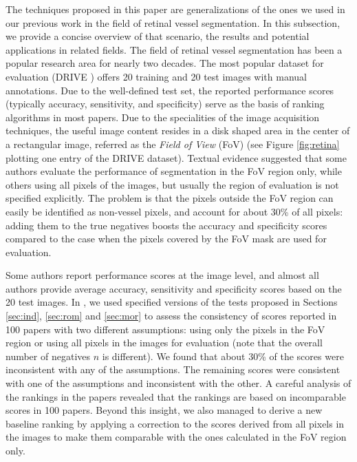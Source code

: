 \documentclass[5p, final]{elsarticle}
\begin{document}
The techniques proposed in this paper are generalizations of the ones we used in our previous work \cite{vessel} in the field of retinal vessel segmentation. In this subsection, we provide a concise overview of that scenario, the results and potential applications in related fields. 
The field of retinal vessel segmentation has been a popular research area for nearly two decades. The most popular dataset for evaluation (DRIVE \cite{drive}) offers 20 training and 20 test images with manual annotations. Due to the well-defined test set, the reported performance scores (typically accuracy, sensitivity, and specificity) serve as the basis of ranking algorithms in most papers. 
Due to the specialities of the image acquisition techniques, the useful image content resides in a disk shaped area in the center of a rectangular image, referred as the \emph{Field of View} (FoV) (see Figure \ref{fig:retina} plotting one entry of the DRIVE dataset). Textual evidence suggested that some authors evaluate the performance of segmentation in the FoV region only, while others using all pixels of the images, but usually the region of evaluation is not specified explicitly. The problem is that the pixels outside the FoV region can easily be identified as non-vessel pixels, and account for about 30\% of all pixels: adding them to the true negatives boosts the accuracy and specificity scores compared to the case when the pixels covered by the FoV mask are used for evaluation.

Some authors report performance scores at the image level, and almost all authors provide average accuracy, sensitivity and specificity scores based on the 20 test images. In \cite{vessel}, we used specified versions of the tests proposed in Sections \ref{sec:ind}, \ref{sec:rom} and \ref{sec:mor} to assess the consistency of scores reported in 100 papers with two different assumptions: using only the pixels in the FoV region or using all pixels in the images for evaluation (note that the overall number of negatives $n$ is different). 
We found that about 30\% of the scores were inconsistent with any of the assumptions. The remaining scores were consistent with one of the assumptions and inconsistent with the other. A careful analysis of the rankings in the papers revealed that the rankings are based on incomparable scores in 100 papers. Beyond this insight, we also managed to derive a new baseline ranking by applying a correction to the scores derived from all pixels in the images to make them comparable with the ones calculated in the FoV region only.
\end{document}
